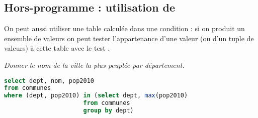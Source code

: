 \subsection{Hors-programme : utilisation de }
On peut aussi utiliser une table calculée dans une condition  : si on produit un ensemble de valeurs on peut tester l'appartenance d'une valeur (ou d'un tuple de valeurs) à cette table avec le test .
\begin{Exercise}
\it Donner le nom de la ville la plus peuplée par département.
\end{Exercise}
\begin{Answer}
\begin{lstlisting}[language=SQL]
select dept, nom, pop2010
from communes
where (dept, pop2010) in (select dept, max(pop2010)
                      from communes
					  group by dept)
\end{lstlisting}
\end{Answer}




























